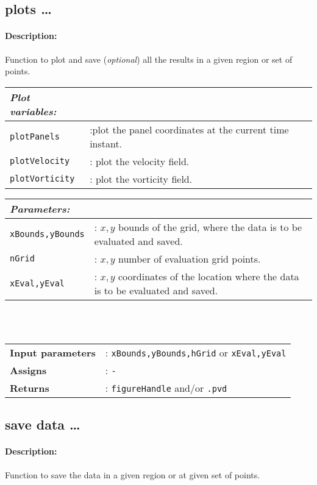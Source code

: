 		
\subsection{plots \ldots}
	\paragraph{Description:} Function to plot and save (\textit{optional}) all the results in a given region or set of points.\\
	
		\begin{tabular}{lp{10cm}}
			\textit{Plot variables:} & \\ \hline
			\texttt{plotPanels} &:plot the panel coordinates at the current time instant.\\
			\texttt{plotVelocity} &: plot the velocity field.\\ 
			\texttt{plotVorticity} &: plot the vorticity field.\\ 
		\end{tabular} \vspace{5 mm}
		
		\begin{tabular}{lp{10cm}}
			\textit{Parameters:} & \\ \hline
			\texttt{xBounds,yBounds} &: $x,y$ bounds of the grid, where the data is to be evaluated and saved.\\ 
			\texttt{nGrid} &: $x,y$ number of evaluation grid points.\\ 
			\texttt{xEval,yEval} &: $x,y$ coordinates of the location where the data is to be evaluated and saved.\\ 
		\end{tabular} \vspace{5 mm}\\
	\\
	\begin{tabular}{lp{10cm}}
		\textbf{Input parameters} &: \texttt{xBounds,yBounds,hGrid} or \texttt{xEval,yEval}\\ 
		\textbf{Assigns} &: \texttt{-}\\ 			
		\textbf{Returns} &: \texttt{figureHandle} and/or \texttt{.pvd}\\ 					
	\end{tabular}	

\subsection{save data \ldots}
	\paragraph{Description:} Function to save the data in a given region or at given set of points.\\

